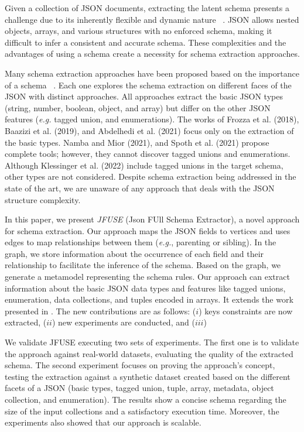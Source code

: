 \color{black} 

Given a collection of JSON documents, extracting the latent schema presents a challenge due to its inherently flexible and dynamic nature ~\citep{canovas2013discovering}. JSON allows nested objects, arrays, and various structures with no enforced schema, making it difficult to infer a consistent and accurate schema. 
These complexities and the advantages of using a schema create a necessity for schema extraction approaches. 

Many schema extraction approaches have been proposed based on the importance of a schema ~\citep{frozza2018approach, baazizi2019parametric,abdelhedi2021automatic, klessinger2022extracting}. Each one explores the schema extraction on different faces of the JSON with distinct approaches. All approaches extract the basic JSON types (string, number, boolean, object, and array) but differ on the other JSON features (\textit{e.g.} tagged union, and enumerations). The works of Frozza et al. (2018), Baazizi et al. (2019), and Abdelhedi et al. (2021) focus only on the extraction of the basic types. Namba and Mior (2021), and Spoth et al. (2021) propose complete tools; however, they cannot discover tagged unions and enumerations. Although Klessinger et al. (2022) include tagged unions in the target schema, other types are not considered. 
Despite schema extraction being addressed in the state of the art, we are unaware of any approach that deals with the JSON structure complexity. 

In this paper, we present \textit{JFUSE} (Json FUll Schema Extractor), a novel approach for schema extraction. Our approach maps the JSON fields to vertices and uses edges to map relationships between them (\textit{e.g.}, parenting or sibling). In the graph, we store information about the occurrence of each field and their relationship to facilitate the inference of the schema. Based on the graph, we generate a metamodel representing the schema rules. Our approach can extract information about the basic JSON data types and features like tagged unions, enumeration, data collections, and tuples encoded in arrays.
\color{blue} 
It extends the work presented in \cite{Ba+24}. 
The new contributions are as follows: ($i$) keys constraints are now extracted, ($ii$) new experiments are conducted, and ($iii$)


\color{black}

We validate JFUSE executing two sets of experiments. The first one is to validate the approach against real-world datasets, evaluating the quality of the extracted schema. The second experiment focuses on proving the approach's concept, testing the extraction against a synthetic dataset created based on the different facets of a JSON (basic types, tagged union, tuple, array, metadata, object collection, and enumeration). The results show a concise schema regarding the size of the input collections and a satisfactory execution time. Moreover, the experiments also showed that our approach is scalable. 


